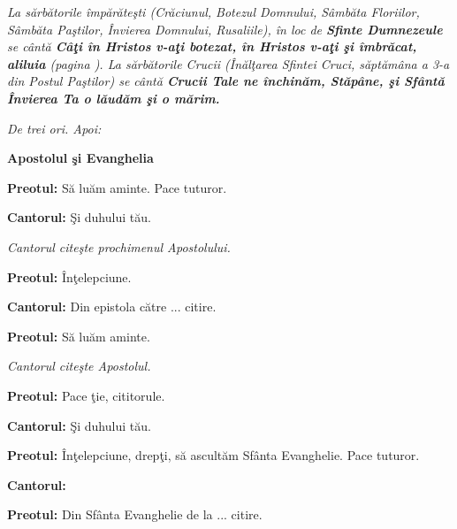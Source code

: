 \documentclass[11pt,letterpaper]{book} \usepackage{ucs}
\newcommand{\mysection}[1]{\begin{center}{\Large \bf #1}\end{center}}
\begin{document}
  {\em La sărbătorile împărăteşti (Crăciunul, Botezul Domnului,
  Sâmbăta Floriilor, Sâmbăta Paştilor, Învierea Domnului, Rusaliile),
  în loc de {\bf Sfinte Dumnezeule} se cântă {\bf Câţi în Hristos
  v-aţi botezat, în Hristos v-aţi şi îmbrăcat, aliluia} (pagina
  \pageref{cati_in_hristos}). La sărbătorile Crucii (Înălţarea Sfintei
  Cruci, săptămâna a 3-a din Postul Paştilor) se cântă {\bf Crucii
  Tale ne închinăm, Stăpâne, şi Sfântă Învierea Ta o lăudăm şi o
  mărim.}}
  \pagebreak


  \begin{center}
    {\em De trei ori. Apoi:}
  \end{center}


  \label{cati_in_hristos}

  \mysection{Apostolul şi Evanghelia}

  {\bf Preotul:} Să luăm aminte. Pace tuturor.

  {\bf Cantorul:} Şi duhului tău.

  \begin{center}
    {\em Cantorul citeşte prochimenul Apostolului.}
  \end{center}

  {\bf Preotul:} Înţelepciune.

  {\bf Cantorul:} Din epistola către ... citire.

  {\bf Preotul:} Să luăm aminte.

  \begin{center}
    {\em Cantorul citeşte Apostolul.}
  \end{center}

  {\bf Preotul:} Pace ţie, cititorule.

  {\bf Cantorul:} Şi duhului tău.


  {\bf Preotul:} Înţelepciune, drepţi, să ascultăm Sfânta
  Evanghelie. Pace tuturor.

  {\bf Cantorul:}\\[-10mm]
  \begin{center}
  \end{center}

  {\bf Preotul:} Din Sfânta Evanghelie de la ... citire.
  \pagebreak
\end{document}
